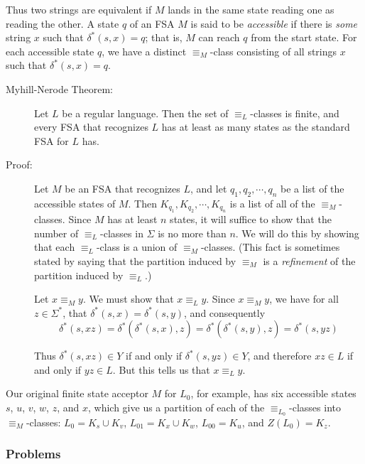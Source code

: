 \documentclass{article}
\begin{document}
Thus two strings are equivalent if $M$ lands in the same state reading one as reading the other. A state $q$ of an FSA $M$ is said to be \emph{accessible} if there is \emph{some} string $x$ such that $\delta^*(s,x) = q$; that is, $M$ can reach $q$ from the start state. For each accessible state $q$, we have a distinct $\equiv_{M}$-class consisting of all strings $x$ such that $\delta^*(s,x) = q$. 

\begin{description}

\item[Myhill-Nerode Theorem:] Let $L$ be a regular language. Then the set of $\equiv_L$-classes is finite, and every FSA that recognizes $L$ has at least as many states as the standard FSA for $L$ has.

\item[Proof:] Let $M$ be an FSA that recognizes $L$, and let $q_1, q_2, \cdots, q_n$ be a list of the accessible states of $M$. Then $K_{q_1}, K_{q_2}, \cdots, K_{q_n}$ is a list of all of the $\equiv_{M}$-classes. Since $M$ has at least $n$ states, it will suffice to show that the number of $\equiv_{L}$-classes in $\Sigma$ is no more than $n$. We will do this by showing that each $\equiv_{L}$-class is a union of $\equiv_M$-classes. (This fact is sometimes stated by saying that the partition induced by $\equiv_{M}$ is a \emph{refinement} of the partition induced by $\equiv_L$.)

Let $x \equiv_{M} y$. We must show that $x \equiv_L y$. Since $x \equiv_{M} y$, we have for all $z \in \Sigma^*$, that $\delta^*(s,x) = \delta^*(s,y)$, and consequently
\begin{equation*}
\delta^*(s,xz) = \delta^*(\delta^*(s,x),z) = \delta^*(\delta^*(s,y),z) = \delta^*(s,yz)
\end{equation*}

Thus $\delta^*(s,xz) \in Y$ if and only if $\delta^*(s,yz) \in Y$, and therefore $xz \in L$ if and only if $yz \in L$. But this tells us that $x \equiv_L y$.

\end{description}

Our original finite state acceptor $M$ for $L_0$, for example, has six accessible states $s$, $u$, $v$, $w$, $z$, and $x$, which give us a partition of each of the $\equiv_{L_0}$-classes into $\equiv_M$-classes: $L_0 = K_s \cup K_v$, $L_01 = K_x \cup K_w$, $L_00 = K_u$, and $Z(L_0) = K_z$.


\subsubsection*{Problems}
\end{document}
